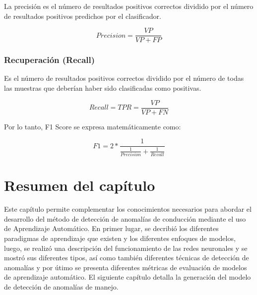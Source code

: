 La precisi\'{o}n es el n\'{u}mero de resultados positivos correctos dividido por el n\'{u}mero de resultados positivos predichos por el clasificador.

\begin{equation}
Precision = \frac{VP}{VP+FP}
\end{equation}

\subsubsection{Recuperaci\'{o}n (Recall)}

Es el n\'{u}mero de resultados positivos correctos dividido por el n\'{u}mero de todas las muestras que deber\'{i}an haber sido clasificadas como positivas.

\begin{equation}
Recall = TPR = \frac{VP}{VP+FN}
\end{equation}

Por lo tanto, F1 Score se expresa matem\'{a}ticamente como:

\begin{equation}
F1 = 2*\frac{1}{\frac{1}{Precision}+\frac{1}{Recall}}
\end{equation}

\section{Resumen del cap\'{i}tulo}

Este cap\'{i}tulo permite complementar los conocimientos necesarios para abordar el desarrollo del m\'{e}todo de detecci\'{o}n de anomal\'{i}as de conducci\'{o}n mediante el uso de Aprendizaje Autom\'{a}tico. En primer lugar, se decribi\'{o} los diferentes paradigmas de aprendizaje que existen y los diferentes enfoques de modelos, luego, se realiz\'{o} una descripci\'{o}n del funcionamiento de las redes neuronales y se mostr\'{o} sus diferentes tipos, as\'{i} como tambi\'{e}n diferentes t\'{e}cnicas de detecci\'{o}n de anomal\'{i}as y por \'{u}timo se presenta diferentes m\'{e}tricas de evaluaci\'{o}n de modelos de aprendizaje autom\'{a}tico. El siguiente cap\'{i}tulo detalla la generaci\'{o}n del modelo de detecci\'{o}n de anomal\'{i}as de manejo.